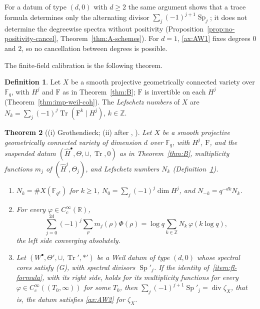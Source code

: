 \documentclass[11pt]{amsart}
\theoremstyle{plain}
\newtheorem{theorem}{Theorem}[section]
\theoremstyle{definition}
\newtheorem{definition}[theorem]{Definition}
\theoremstyle{remark}
\numberwithin{equation}{section}
\newcommand{\R}{\mathbb{R}}
\newcommand{\Z}{\mathbb{Z}}
\newcommand{\F}{\mathbb{F}}
\DeclareMathOperator{\Tr}{Tr}
\DeclareMathOperator{\divisor}{div}
\begin{document}
For a datum of type $(d,0)$ with $d\ge2$ the same argument shows that a
trace formula determines only the alternating divisor
$\sum_j(-1)^{j+1}\operatorname{Sp}_j$; it does not determine the
degreewise spectra without positivity
(Proposition~\ref{prop:no-positivity-cancel},
Theorem~\ref{thm:A-schemes}). For $d=1$, \ref{ax:AW1} fixes degrees
$0$ and $2$, so no cancellation between degrees is possible.

The finite-field calibration is the following theorem.

\begin{definition}\label{def:lefschetz-numbers}
Let $X$ be a smooth projective geometrically connected variety over
$\F_q$, with $H^j$ and $\mathrm F$ as in Theorem~\ref{thm:B}; $\mathrm F$
is invertible on each $H^j$ (Theorem~\ref{thm:imp-weil-coh}). The
\emph{Lefschetz numbers} of $X$ are
$N_k=\sum_j(-1)^j\Tr(\mathrm F^k\mid H^j)$, $k\in\Z$.
\end{definition}

\begin{theorem}[{(i) Grothendieck; (ii) after
\cite[(2), p.~3]{Deninger2002Explicit},
\cite[(10), p.~172]{Deninger1998Analogies}}]\label{thm:ff-lefschetz}
Let $X$ be a smooth projective geometrically connected variety of
dimension $d$ over $\F_q$, with $H^j$, $\mathrm F$, and the suspended
datum $(\widehat H^\bullet,\Theta,\cup,\Tr,0)$ as in
Theorem~\ref{thm:B}, multiplicity functions $m_j$ of
$(\widehat H^j,\Theta_j)$, and Lefschetz numbers $N_k$
(Definition~\ref{def:lefschetz-numbers}).
\begin{enumerate}[label=(\roman*)]
\item\label{item:fl-counts} $N_k=\#X(\F_{q^k})$ for $k\ge1$,
  $N_0=\sum_j(-1)^j\dim H^j$, and $N_{-k}=q^{-dk}N_k$.
\item\label{item:fl-formula} For every $\varphi\in C_c^\infty(\R)$,
  \[
  \sum_{j=0}^{2d}(-1)^j\sum_\rho m_j(\rho)\Phi(\rho)
  =\log q\sum_{k\in\Z}N_k\,\varphi(k\log q),
  \]
  the left side converging absolutely.
\item\label{item:fl-converse} Let $(W^\bullet,\Theta',\cup,\Tr',*')$ be
  a Weil datum of type $(d,0)$ whose spectral cores satisfy (G), with
  spectral divisors $\operatorname{Sp}'_j$. If the identity
  of~\ref{item:fl-formula}, with its right side, holds for its
  multiplicity functions for every $\varphi\in C_c^\infty((T_0,\infty))$
  for some $T_0$, then
  $\sum_j(-1)^{j+1}\operatorname{Sp}'_j=\divisor\zeta_X$, that is, the
  datum satisfies \ref{ax:AW2} for $\zeta_X$.
\end{enumerate}
\end{theorem}
\end{document}
